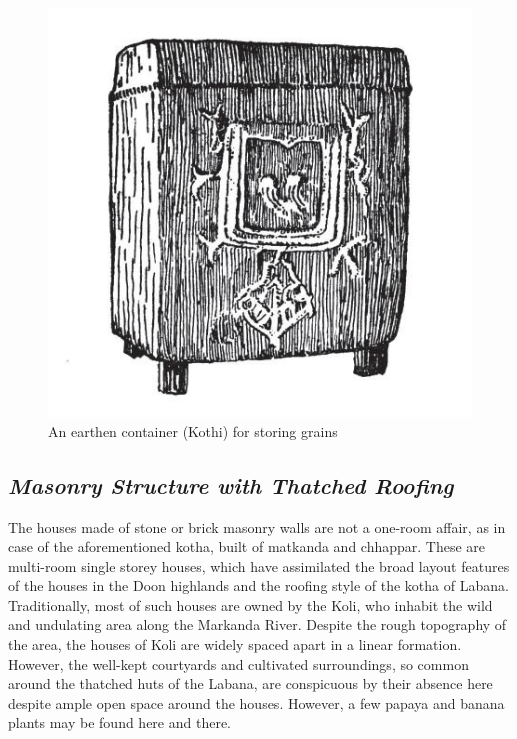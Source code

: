 \begin{figure}[!htbp]
\includegraphics[scale=.35]{images/chap02-22.jpg}
\caption{An earthen container (Kothi) for storing grains}\label{chap02-fig22}
\end{figure}


\subsection*{\textit{Masonry Structure with Thatched Roofing}}

The houses made of stone or brick masonry walls are not a one-room affair, as in case of the aforementioned kotha, built of matkanda and chhappar. These are multi-room single storey houses, which have assimilated the broad layout features of the houses in the Doon highlands and the roofing style of the kotha of Labana. Traditionally, most of such houses are owned by the Koli, who inhabit the wild and undulating area along the Markanda River. Despite the rough topography of the area, the houses of Koli are widely spaced apart in a linear formation. However, the well-kept courtyards and cultivated surroundings, so common around the thatched huts of the Labana, are conspicuous by their absence here despite ample open space around the houses. However, a few papaya and banana plants may be found here and there.

